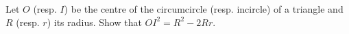 Let $O$ (resp. $I$) be the centre of the circumcircle (resp. incircle) of a triangle and $R$ (resp. $r$) its radius. Show that $OI^2 = R^2 - 2Rr$.
